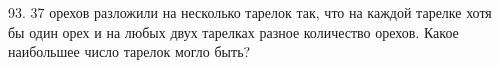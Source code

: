 93. 37 орехов разложили на несколько тарелок так, что на каждой тарелке хотя бы один орех и на любых двух тарелках разное количество орехов. Какое наибольшее число тарелок могло быть?\\
